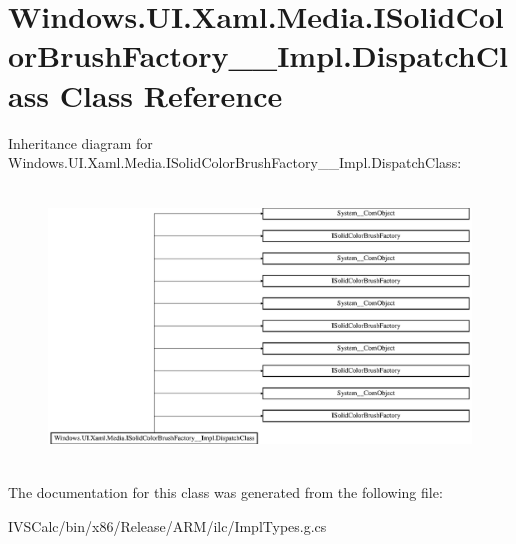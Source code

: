 \hypertarget{class_windows_1_1_u_i_1_1_xaml_1_1_media_1_1_i_solid_color_brush_factory_____impl_1_1_dispatch_class}{}\section{Windows.\+U\+I.\+Xaml.\+Media.\+I\+Solid\+Color\+Brush\+Factory\+\_\+\+\_\+\+Impl.\+Dispatch\+Class Class Reference}
\label{class_windows_1_1_u_i_1_1_xaml_1_1_media_1_1_i_solid_color_brush_factory_____impl_1_1_dispatch_class}
Inheritance diagram for Windows.\+U\+I.\+Xaml.\+Media.\+I\+Solid\+Color\+Brush\+Factory\+\_\+\+\_\+\+Impl.\+Dispatch\+Class\+:\begin{figure}[H]
\begin{center}
\leavevmode
\includegraphics[height=7.350835cm]{class_windows_1_1_u_i_1_1_xaml_1_1_media_1_1_i_solid_color_brush_factory_____impl_1_1_dispatch_class}
\end{center}
\end{figure}


The documentation for this class was generated from the following file\+:\begin{DoxyCompactItemize}
\item 
I\+V\+S\+Calc/bin/x86/\+Release/\+A\+R\+M/ilc/Impl\+Types.\+g.\+cs\end{DoxyCompactItemize}

